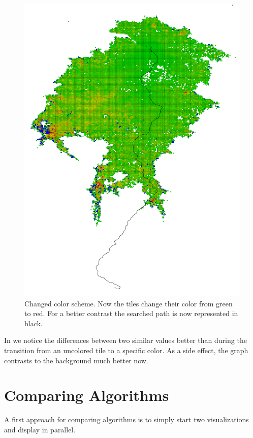 \documentclass
[
    paper = a4,
    pagesize,
    12 pt,
    twoside,                       %
    open = right,
    DIV = calc,
    BCOR = 0 mm,                   %
    bibtotoc
]
{scrbook}
\begin{document}
\begin{figure}
    \includegraphics[width=\textwidth]{Images/vis-hsv-cache.png}
\caption[]{Changed color scheme. Now the tiles change their color from green to red. For a better contrast the searched path is now represented in black.}
\label{fig:reload_coloring_hsv}
\end{figure}

In  we notice the differences between two similar values better than during the transition from an uncolored tile to a specific color.
As a side effect, the graph contrasts to the background much better now.

\section{Comparing Algorithms} \label{compare}
A first approach for comparing algorithms is to simply start two visualizations and display in parallel.
\end{document}
